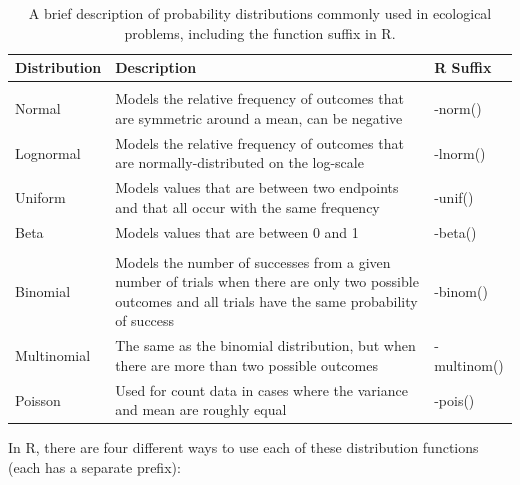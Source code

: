\documentclass[]{book}
\theoremstyle{definition}
\theoremstyle{definition}
\theoremstyle{definition}
\theoremstyle{remark}
\begin{document}
\begin{table}

\caption{\label{tab:dist-table-pdf}A brief description of probability distributions commonly used in ecological problems, including the function suffix in R.}
\centering
\begin{tabular}[t]{l>{\raggedright\arraybackslash}p{20em}>{\ttfamily}l}
\toprule
\textbf{Distribution} & \textbf{Description} & \textbf{R Suffix}\\
\midrule
\addlinespace[0.3em]
\multicolumn{3}{l}{\textbf{Continuous}}\\
\hline
\hspace{1em}Normal & Models the relative frequency of outcomes that are symmetric around a mean, can be negative & -norm()\\
\hspace{1em}Lognormal & Models the relative frequency of outcomes that are normally-distributed on the log-scale & -lnorm()\\
\hspace{1em}Uniform & Models values that are between two endpoints and that all occur with the same frequency & -unif()\\
\hspace{1em}Beta & Models values that are between 0 and 1 & -beta()\\
\addlinespace[0.3em]
\multicolumn{3}{l}{\textbf{Discrete}}\\
\hline
\hspace{1em}Binomial & Models the number of successes from a given number of trials when there are only two possible outcomes and all trials have the same probability of success & -binom()\\
\hspace{1em}Multinomial & The same as the binomial distribution, but when there are more than two possible outcomes & -multinom()\\
\hspace{1em}Poisson & Used for count data in cases where the variance and mean are roughly equal & -pois()\\
\bottomrule
\end{tabular}
\end{table}

In R, there are four different ways to use each of these distribution
functions (each has a separate prefix):
\end{document}
